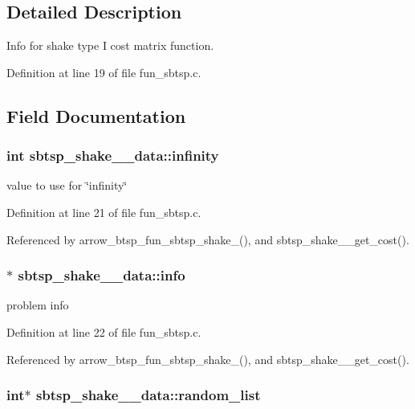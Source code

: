 \subsection{Detailed Description}
Info for shake type I cost matrix function. 

Definition at line 19 of file fun\_\-sbtsp.c.

\subsection{Field Documentation}
\hypertarget{structsbtsp__shake__1__data_47ef3fa3aae68c0dc3c41d4669f12029}{
\subsubsection[{infinity}]{\setlength{\rightskip}{0pt plus 5cm}int {\bf sbtsp\_\-shake\_\_\-data::infinity}}}
\label{structsbtsp__shake__1__data_47ef3fa3aae68c0dc3c41d4669f12029}


value to use for \char`\"{}infinity\char`\"{} 

Definition at line 21 of file fun\_\-sbtsp.c.

Referenced by arrow\_\-btsp\_\-fun\_\-sbtsp\_\-shake\_(), and sbtsp\_\-shake\_\_\-get\_\-cost().\hypertarget{structsbtsp__shake__1__data_3a8115357fcf4016ea804a21bd68168c}{
\subsubsection[{info}]{$\ast$ {\bf sbtsp\_\-shake\_\_\-data::info}}}
\label{structsbtsp__shake__1__data_3a8115357fcf4016ea804a21bd68168c}


problem info 

Definition at line 22 of file fun\_\-sbtsp.c.

Referenced by arrow\_\-btsp\_\-fun\_\-sbtsp\_\-shake\_(), and sbtsp\_\-shake\_\_\-get\_\-cost().\hypertarget{structsbtsp__shake__1__data_c518a861d13f3260420bce5fbe0c669c}{
\subsubsection[{random\_\-list}]{\setlength{\rightskip}{0pt plus 5cm}int$\ast$ {\bf sbtsp\_\-shake\_\_\-data::random\_\-list}}}
\label{structsbtsp__shake__1__data_c518a861d13f3260420bce5fbe0c669c}


